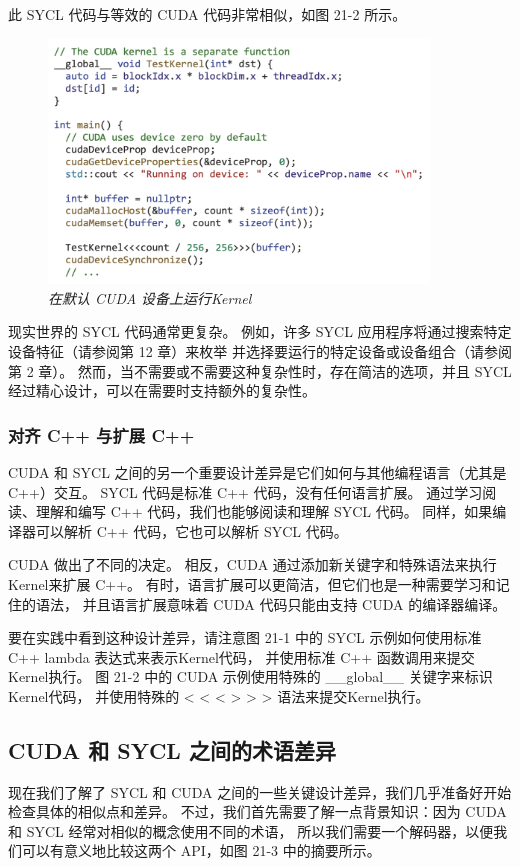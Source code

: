 此 SYCL 代码与等效的 CUDA 代码非常相似，如图 21-2 所示。

\begin{figure}[H]
	\centering
	\includegraphics[width=0.9\textwidth]{figs/F21.2.png}
	\caption{\textit{在默认 CUDA 设备上运行Kernel }}
\end{figure}

现实世界的 SYCL 代码通常更复杂。 
例如，许多 SYCL 应用程序将通过搜索特定设备特征（请参阅第 12 章）来枚举
并选择要运行的特定设备或设备组合（请参阅第 2 章）。 
然而，当不需要或不需要这种复杂性时，存在简洁的选项，并且 SYCL 经过精心设计，可以在需要时支持额外的复杂性。

\subsubsection{对齐 C++ 与扩展 C++}
CUDA 和 SYCL 之间的另一个重要设计差异是它们如何与其他编程语言（尤其是 C++）交互。 
SYCL 代码是标准 C++ 代码，没有任何语言扩展。 
通过学习阅读、理解和编写 C++ 代码，我们也能够阅读和理解 SYCL 代码。 
同样，如果编译器可以解析 C++ 代码，它也可以解析 SYCL 代码。

CUDA 做出了不同的决定。 相反，CUDA 通过添加新关键字和特殊语法来执行Kernel来扩展 C++。 
有时，语言扩展可以更简洁，但它们也是一种需要学习和记住的语法，
并且语言扩展意味着 CUDA 代码只能由支持 CUDA 的编译器编译。

要在实践中看到这种设计差异，请注意图 21-1 中的 SYCL 示例如何使用标准 C++ lambda 表达式来表示Kernel代码，
并使用标准 C++ 函数调用来提交Kernel执行。 
图 21-2 中的 CUDA 示例使用特殊的 \_\_global\_\_ 关键字来标识Kernel代码，
并使用特殊的 < < < > > > 语法来提交Kernel执行。

\subsection{CUDA 和 SYCL 之间的术语差异}
现在我们了解了 SYCL 和 CUDA 之间的一些关键设计差异，我们几乎准备好开始检查具体的相似点和差异。 
不过，我们首先需要了解一点背景知识：因为 CUDA 和 SYCL 经常对相似的概念使用不同的术语，
所以我们需要一个解码器，以便我们可以有意义地比较这两个 API，如图 21-3 中的摘要所示。

